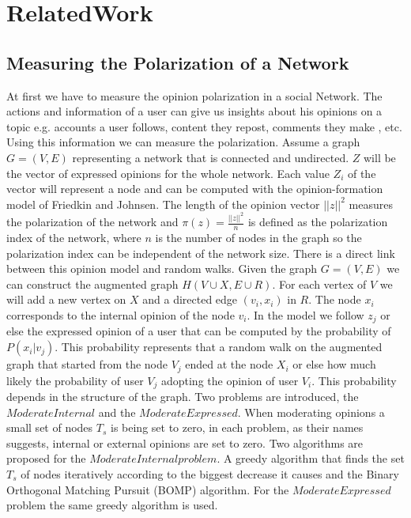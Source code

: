 \chapter{RelatedWork}
\label{ch:Instructions}


\section{Measuring the Polarization of a Network}
\label{sec:Submission}

At first we have to measure the opinion polarization in a social Network. The actions and information of a user can give us insights about his opinions on a topic e.g. accounts a user follows, content they repost, comments they make , etc. Using this information we can measure the polarization. Assume a graph $G = (V,E)$ representing a network that is connected and undirected. $Z$ will be the vector of expressed opinions for the whole network. Each value $Z_i$ of the vector will represent a node and can be computed with the opinion-formation model of Friedkin and Johnsen. The length of the opinion vector $||z|| ^2$ measures  the polarization of the network and  $\pi(z) = \frac{||z|| ^2}n$ is defined as the polarization index of the network, where  $n$ is the number of nodes in the graph so the polarization index can be independent of the network size. There is a direct link between this opinion model and random walks. Given the graph $G = (V,E)$ we can construct the augmented graph $H(V∪X, E∪R)$. For each vertex of  $V$ we will add a new vertex on $X$ and a directed edge $(v_i,x_i)$ in $R$. The node $x_i$ corresponds to the internal opinion of the node $v_i$. In the model we follow $z_j$ or else the expressed opinion of a user that can be computed by the probability of $P(x_i |v_j)$. This probability represents that a random walk on the augmented graph that started from the node $V_j$ ended at the node $X_i$ or else how much likely the probability of user $V_j$ adopting the opinion of user $V_i$. This probability depends in the structure of the graph. Two problems are introduced, the $ModerateInternal$ and the $ModerateExpressed$. When moderating opinions a small set of nodes $T_s$ is being set to zero, in each problem, as their names suggests, internal or external opinions are set to zero. Two algorithms are proposed for the $ModerateInternal problem$. A greedy algorithm that finds the set $T_s$ of nodes iteratively according to the biggest decrease it causes and the Binary Orthogonal Matching Pursuit (BOMP) algorithm. For the $ModerateExpressed$ problem the same greedy algorithm is used.
\cite{tsapMatakosTerzi}


